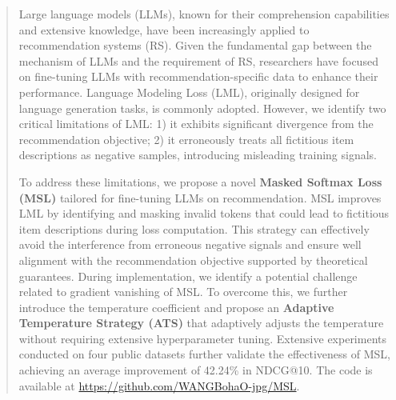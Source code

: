 \documentclass[sigconf,natbib=true]{acmart}
\begin{document}
\begin{abstract}
Large language models (LLMs), known for their comprehension capabilities and extensive knowledge, have been increasingly applied to recommendation systems (RS). Given the fundamental gap between the mechanism of LLMs and the requirement of RS, researchers have focused on fine-tuning LLMs with recommendation-specific data to enhance their performance. Language Modeling Loss (LML),  originally designed for language generation tasks, is commonly adopted. However, we identify two critical limitations of LML: 1) it exhibits significant divergence from the recommendation objective; 2) it erroneously treats all fictitious item descriptions as negative samples, introducing misleading training signals.

To address these limitations, we propose a novel \textbf{Masked Softmax Loss (MSL)} tailored for fine-tuning LLMs on recommendation. MSL improves LML by identifying and masking invalid tokens that could lead to fictitious item descriptions during loss computation. This strategy can effectively avoid the interference from erroneous negative signals and ensure well alignment with the recommendation objective supported by theoretical guarantees. During implementation, we identify a potential challenge related to gradient vanishing of MSL. To overcome this, we further introduce the temperature coefficient and propose an \textbf{Adaptive Temperature Strategy (ATS)} that adaptively adjusts the temperature without requiring extensive hyperparameter tuning. Extensive experiments conducted on four public datasets further validate the effectiveness of MSL, achieving an average improvement of 42.24\% in NDCG@10. The code is available at \url{https://github.com/WANGBohaO-jpg/MSL}.





\end{abstract}
\end{document}
